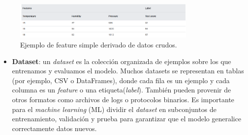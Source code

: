 \documentclass[11pt]{article} %
\begin{document}
\begin{figure}[H]
    \centering
    \includegraphics[width=0.8\textwidth]{Images/Imagen Proyecto.PNG}
    \caption{Ejemplo de feature simple derivado de datos crudos.}
    \label{fig:feature-simple}
\end{figure}

\begin{itemize}
    \item \textbf{Dataset}: un \textit{dataset} es la colección organizada de ejemplos sobre los que entrenamos y evaluamos el modelo. Muchos datasets se representan en tablas (por ejemplo, CSV o DataFrames), donde cada fila es un ejemplo y cada columna es un \textit{feature} o una etiqueta(\textit{label}). También pueden provenir de otros formatos como archivos de logs o protocolos binarios. Es importante para el \textit{machine learning} (ML) dividir el \textit{dataset} en subconjuntos de entrenamiento, validación y prueba para garantizar que el modelo generalice correctamente datos nuevos.
\end{itemize}
\end{document}
